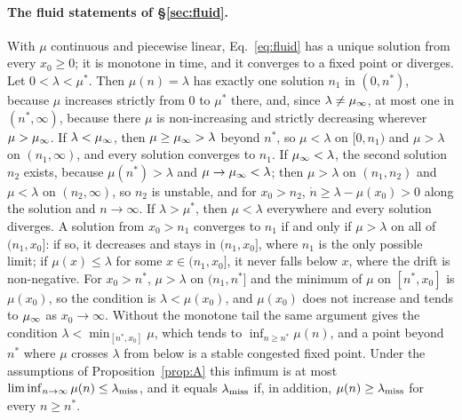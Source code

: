 \paragraph{The fluid statements of \S\ref{sec:fluid}.} With $\mu$ continuous and piecewise linear, Eq.~\eqref{eq:fluid} has a unique solution from every $x_0\ge0$; it is monotone in time, and it converges to a fixed point or diverges. Let $0<\lambda<\mu^*$. Then $\mu(n)=\lambda$ has exactly one solution $n_1$ in $(0,n^*)$, because $\mu$ increases strictly from 0 to $\mu^*$ there, and, since $\lambda\ne\mu_{\infty}$, at most one in $(n^*,\infty)$, because there $\mu$ is non-increasing and strictly decreasing wherever $\mu>\mu_{\infty}$. If $\lambda<\mu_{\infty}$, then $\mu\ge\mu_{\infty}>\lambda$ beyond $n^*$, so $\mu<\lambda$ on $[0,n_1)$ and $\mu>\lambda$ on $(n_1,\infty)$, and every solution converges to $n_1$. If $\mu_{\infty}<\lambda$, the second solution $n_2$ exists, because $\mu(n^*)>\lambda$ and $\mu\to\mu_{\infty}<\lambda$; then $\mu>\lambda$ on $(n_1,n_2)$ and $\mu<\lambda$ on $(n_2,\infty)$, so $n_2$ is unstable, and for $x_0>n_2$, $\dot n\ge\lambda-\mu(x_0)>0$ along the solution and $n\to\infty$. If $\lambda>\mu^*$, then $\mu<\lambda$ everywhere and every solution diverges. A solution from $x_0>n_1$ converges to $n_1$ if and only if $\mu>\lambda$ on all of $(n_1,x_0]$: if so, it decreases and stays in $(n_1,x_0]$, where $n_1$ is the only possible limit; if $\mu(x)\le\lambda$ for some $x\in(n_1,x_0]$, it never falls below $x$, where the drift is non-negative. For $x_0>n^*$, $\mu>\lambda$ on $(n_1,n^*]$ and the minimum of $\mu$ on $[n^*,x_0]$ is $\mu(x_0)$, so the condition is $\lambda<\mu(x_0)$, and $\mu(x_0)$ does not increase and tends to $\mu_{\infty}$ as $x_0\to\infty$. Without the monotone tail the same argument gives the condition $\lambda<\min_{[n^*,x_0]}\mu$, which tends to $\inf_{n\ge n^*}\mu(n)$, and a point beyond $n^*$ where $\mu$ crosses $\lambda$ from below is a stable congested fixed point. Under the assumptions of Proposition~\ref{prop:A} this infimum is at most $\liminf_{n\to\infty}\mu(n)\le\lambda_{\mathrm{miss}}$, and it equals $\lambda_{\mathrm{miss}}$ if, in addition, $\mu(n)\ge\lambda_{\mathrm{miss}}$ for every $n\ge n^*$.

